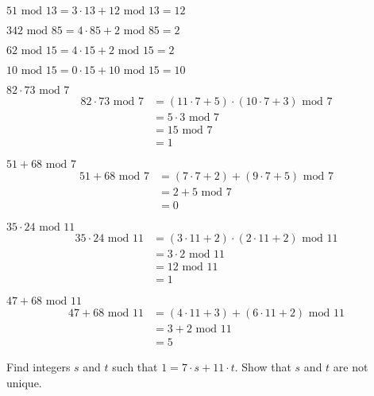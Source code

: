 \documentclass[11pt,largemargins]{homework}
\begin{document}
\begin{alphaparts}
    \questionpart $51\text{ mod }13 = 3\cdot13+ 12\text{ mod }13=12$
    
    \questionpart $342\text{ mod }85 = 4\cdot85+ 2\text{ mod }85=2$
    
    \questionpart $62\text{ mod }15 = 4\cdot15+ 2\text{ mod }15=2$

    \questionpart $10\text{ mod }15 = 0\cdot15+ 10\text{ mod }15=10$

    \questionpart $82\cdot73\text{ mod }7$
    \begin{align*}
        82\cdot73\text{ mod }7 &= (11\cdot7+5)\cdot(10\cdot7+3)\text{ mod }7\\
                               &= 5 \cdot 3 \text{ mod }7\\
                               &= 15\text{ mod }7\\
                               &= 1
    \end{align*}

    \questionpart $51+68\text{ mod }7 $
    \begin{align*}
        51+68\text{ mod }7 &= (7\cdot7+2)+(9\cdot7+5)\text{ mod }7\\
                               &= 2 + 5 \text{ mod }7\\
                               &= 0
    \end{align*}

    \questionpart $35\cdot24\text{ mod }11 $
    \begin{align*}
        35\cdot24\text{ mod }11 &= (3\cdot11+2)\cdot(2\cdot11+2)\text{ mod }11\\
                               &= 3 \cdot 2 \text{ mod }11\\
                               &= 12 \text{ mod }11\\
                               &= 1
    \end{align*}

    \questionpart $47+68\text{ mod }11 $
    \begin{align*}
        47+68\text{ mod }11 &= (4\cdot11+3)+(6\cdot11+2)\text{ mod }11\\
                               &= 3 + 2 \text{ mod }11\\
                               &= 5
    \end{align*}

\end{alphaparts}

\question 
Find integers $s$ and $t$ such that $1 = 7 \cdot s + 11 \cdot t$. Show that $s$ and $t$ are not unique.
\end{document}

